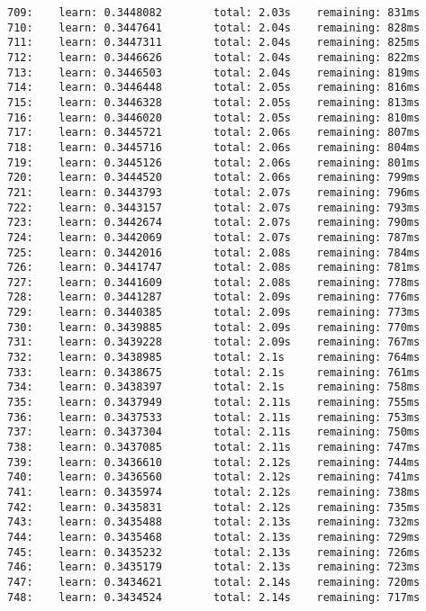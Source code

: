 \documentclass[11pt]{article}
\begin{document}
\begin{Verbatim}[commandchars=\\\{\}]
709:    learn: 0.3448082        total: 2.03s    remaining: 831ms
710:    learn: 0.3447641        total: 2.04s    remaining: 828ms
711:    learn: 0.3447311        total: 2.04s    remaining: 825ms
712:    learn: 0.3446626        total: 2.04s    remaining: 822ms
713:    learn: 0.3446503        total: 2.04s    remaining: 819ms
714:    learn: 0.3446448        total: 2.05s    remaining: 816ms
715:    learn: 0.3446328        total: 2.05s    remaining: 813ms
716:    learn: 0.3446020        total: 2.05s    remaining: 810ms
717:    learn: 0.3445721        total: 2.06s    remaining: 807ms
718:    learn: 0.3445716        total: 2.06s    remaining: 804ms
719:    learn: 0.3445126        total: 2.06s    remaining: 801ms
720:    learn: 0.3444520        total: 2.06s    remaining: 799ms
721:    learn: 0.3443793        total: 2.07s    remaining: 796ms
722:    learn: 0.3443157        total: 2.07s    remaining: 793ms
723:    learn: 0.3442674        total: 2.07s    remaining: 790ms
724:    learn: 0.3442069        total: 2.07s    remaining: 787ms
725:    learn: 0.3442016        total: 2.08s    remaining: 784ms
726:    learn: 0.3441747        total: 2.08s    remaining: 781ms
727:    learn: 0.3441609        total: 2.08s    remaining: 778ms
728:    learn: 0.3441287        total: 2.09s    remaining: 776ms
729:    learn: 0.3440385        total: 2.09s    remaining: 773ms
730:    learn: 0.3439885        total: 2.09s    remaining: 770ms
731:    learn: 0.3439228        total: 2.09s    remaining: 767ms
732:    learn: 0.3438985        total: 2.1s     remaining: 764ms
733:    learn: 0.3438675        total: 2.1s     remaining: 761ms
734:    learn: 0.3438397        total: 2.1s     remaining: 758ms
735:    learn: 0.3437949        total: 2.11s    remaining: 755ms
736:    learn: 0.3437533        total: 2.11s    remaining: 753ms
737:    learn: 0.3437304        total: 2.11s    remaining: 750ms
738:    learn: 0.3437085        total: 2.11s    remaining: 747ms
739:    learn: 0.3436610        total: 2.12s    remaining: 744ms
740:    learn: 0.3436560        total: 2.12s    remaining: 741ms
741:    learn: 0.3435974        total: 2.12s    remaining: 738ms
742:    learn: 0.3435831        total: 2.12s    remaining: 735ms
743:    learn: 0.3435488        total: 2.13s    remaining: 732ms
744:    learn: 0.3435468        total: 2.13s    remaining: 729ms
745:    learn: 0.3435232        total: 2.13s    remaining: 726ms
746:    learn: 0.3435179        total: 2.13s    remaining: 723ms
747:    learn: 0.3434621        total: 2.14s    remaining: 720ms
748:    learn: 0.3434524        total: 2.14s    remaining: 717ms

\end{Verbatim}
\end{document}
